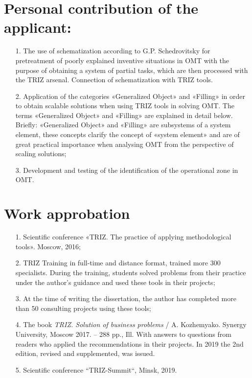 \documentclass[11pt,a4paper]{book}
\begin{document}
\section{Personal contribution of the applicant:}
\begin{itemize}
\item[1.] The use of schematization according to G.P. Schedrovitsky for
  pretreatment of poorly explained inventive situations in OMT with the
  purpose of obtaining a system of partial tasks, which are then processed
  with the TRIZ arsenal.  Connection of schematization with TRIZ tools.
\item[2.] Application of the categories «Generalized Object» and «Filling» in
  order to obtain scalable solutions when using TRIZ tools in solving OMT. The
  terms «Generalized Object» and «Filling» are explained in detail below.
  Briefly: «Generalized Object» and «Filling» are subsystems of a system
  element, these concepts clarify the concept of «system element» and are of
  great practical importance when analysing OMT from the perspective of
  scaling solutions;
\item[3.] Development and testing of the identification of the operational
  zone in OMT.
\end{itemize}
\section{Work approbation}
\begin{itemize}
\item[1.] Scientific conference «TRIZ. The practice of applying methodological
  tools». Moscow, 2016;
\item[2.] TRIZ Training in full-time and distance format, trained more 300
  specialists. During the training, students solved problems from their
  practice under the author’s guidance and used these tools in their projects;
\item[3.] At the time of writing the dissertation, the author has completed
  more than 50 consulting projects using these tools;
\item[4.] The book \emph{TRIZ. Solution of business problems} /
  A. Kozhemyako. Synergy University, Moscow 2017. -- 288 pp., Ill. With
  answers to questions from readers who applied the recommendations in their
  projects.  In 2019 the 2nd edition, revised and supplemented, was issued.
\item[5.] Scientific conference “TRIZ-Summit“, Minsk, 2019.
\end{itemize}
\end{document}
